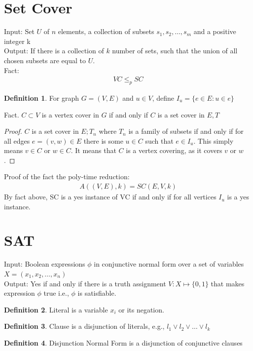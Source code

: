 \documentclass[a4paper]{article}
\theoremstyle{plain}
\theoremstyle{definition}
\newtheorem{defn}{Definition}[section]
\theoremstyle{remark}
\begin{document}
	\section{Set Cover}
	Input: Set $U$ of $n$ elements, a collection of subsets $s_1,s_2,\ldots,s_m$ and a positive integer k\\
	Output: If there is a collection of $k$ number of sets, such that the union of all chosen subsets are equal to $U$. \\
	Fact:
	\begin{align*}
		VC \le_p SC
	\end{align*}
	\begin{defn}
		For graph $G = (V,E)$ and $u \in V$, define $I_u = \{e \in E : u \in e\}$
	\end{defn}
	Fact. $C \subset V$ is a vertex cover in $G$ if and only if $C$ is a set cover in $E, T$ 
	\begin{proof}
	$C$ is a set cover in $E;T_n$ where $T_n$ is a family of subsets if and only if for all edges $e=(v,w)\in E$ there is some $u\in C$ such that $e \in I_u$. This simply means $v \in C$ or $w \in C$. It means that $C$ is a vertex covering, as it covers $v$ or $w$.
	\end{proof}
	Proof of the fact the poly-time reduction:
	\begin{align*}
		A((V,E),k) = SC(E,V,k)
	\end{align*}
	By fact above, SC is a yes instance of VC if and only if for all vertices $I_u$ is a yes instance.
	\section{SAT}
	Input: Boolean expressions $\phi$ in conjunctive normal form over a set of variables $X=(x_1,x_2,\ldots,x_n)$\\
	Output: Yes if and only if there is a truth assignment $V : X \mapsto \{0,1\}$ that makes expression $\phi$ true i.e., $\phi$ is satisfiable. 
	\begin{defn}
		Literal is a variable $x_i$ or its negation.
	\end{defn}
	\begin{defn}
		Clause is a disjunction of literals, e.g., $l_1 \lor l_2 \lor \ldots \lor l_k$
	\end{defn}
	\begin{defn}
		Disjunction Normal Form is a disjunction of conjunctive clauses
	\end{defn}
\end{document}
